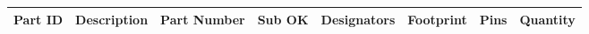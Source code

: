 \documentclass{article}
\begin{document}


\begin{center}
    \begin{longtable}{| r | p{4.7cm} | l | l | p{3.8cm} | l | r | r |}
    \hline
	\multicolumn{1}{|l|}{\textbf{Part ID}} & \multicolumn{1}{l|}{\textbf{Description}} & \multicolumn{1}{l|}{\textbf{Part Number}} & \multicolumn{1}{l|}{\textbf{Sub OK}} & \multicolumn{1}{l|}{\textbf{Designators}} & \multicolumn{1}{l|}{\textbf{Footprint}} & \multicolumn{1}{r|}{\textbf{Pins}} & \multicolumn{1}{r|}{\textbf{Quantity}} \\ \hline	 
	\endhead
	
    \end{longtable}
\end{center}


\end{document}
